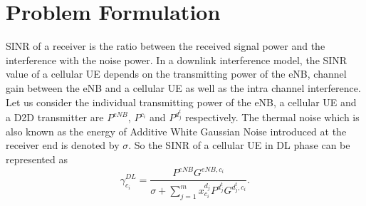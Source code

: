 \documentclass[times]{dacauth}
\begin{document}
		  
	
	







\section{Problem Formulation}\label{section:Problem Formulation}
\noindent
SINR of a receiver is the ratio between the received signal power and the interference with the noise power. In a downlink interference model, the SINR value of a cellular UE depends on the transmitting power of the eNB, channel gain between the eNB and a cellular UE as well as the intra channel interference. Let us consider the individual transmitting power of the eNB, a cellular UE and a D2D transmitter are $P^{eNB}$, $P^{c_i}$ and $P^{d_j^t}$ respectively. The thermal noise which is also known as the energy of Additive White Gaussian Noise introduced at the receiver end is denoted by $\sigma$. So the SINR of a cellular UE in DL phase \cite{zulhasnine} can be represented as
 \begin{equation}\label{eqn:sinr_c}
 \gamma_{c_i}^{DL} = \frac{P^{eNB}G^{eNB,c_i}}{\sigma + \sum_{j=1}^{m} x_{c_i}^{d_j}P^{d_j^t}G^{d_j^t,c_i}}.
 \end{equation}
 
\end{document}
